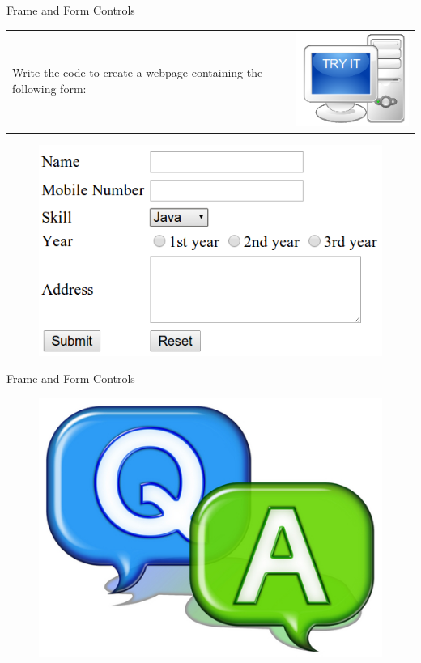 \documentclass[14pt]{beamer}
\begin{document}
\begin{frame}{Frame and Form Controls}
\begin{tabular}{p{8cm} p{2cm}}
Write the code to create a webpage containing the following form: & \includegraphics[scale=.25]{try-it.png}  \\
\end{tabular}


\begin{figure}[H]
 \centering
 \includegraphics[scale=.4]{exercise-try-it.png}
\end{figure}
\end{frame}

\begin{frame}{Frame and Form Controls}
 \begin{figure}[H]
 \begin{center}
   \includegraphics[scale=.3]{qa.png}   
 \end{center}
  \end{figure}
\end{frame}
\end{document}
